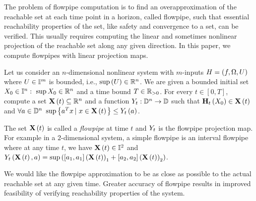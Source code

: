 The problem of flowpipe computation is to find an overapproximation of
the reachable set at each time point in a horizon, called flowpipe,
such that essential reachability properties of the set, like safety
and convergence to a set, can be verified.  This usually requires
computing the linear and sometimes nonlinear projection of the
reachable set along any given direction.  In this paper, we compute
flowpipes with linear projection maps.
%
\begin{problem}
Let us consider an $n$-dimensional nonlinear system with $m$-inputs $H
= \left(f,\Omega,U\right)$ where $U\in\mathbb{I}^m$ is bounded, i.e.,
$\sup\left(U\right)\in\mathbb{R}^n$.  We are given a bounded initial set
$X_0\in\mathbb{I}^n:~\sup{X_0}\in\mathbb{R}^n$ and a time bound
$T\in\mathbb{R}_{> 0}$.  For every $t\in[0,T]$, compute a set
$\mathbf{X}\left(t\right)\subseteq \mathbb{R}^n$ and a function
$Y_{t}:\mathbb{D}^n\rightarrow \mathbb{D}$ such that
$\mathbf{H}_{t}\left(X_0\right)\in\mathbf{X}\left(t\right)$ and $\forall
a\in\mathbb{D}^n~\sup\left\{a^Tx\left|~x\in\mathbf{X}\left(t\right)\right.\right\}\leq
Y_{t}\left(a\right)$.
\end{problem}
%
The set $\mathbf{X}\left(t\right)$ is called a 
\emph{flowpipe} at time $t$ and $Y_{t}$ is the flowpipe projection map.
For example in a $2$-dimensional system, a simple flowpipe is an
interval flowpipe where at any time $t$, we have
$\mathbf{X}\left(t\right)\in\mathbb{I}^2$ and $Y_{t}\left(\mathbf{X}\left(t\right),a\right) =
\sup\left([a_1,a_1]\left(\mathbf{X}\left(t\right)\right)_1 + [a_2,a_2]\left(\mathbf{X}\left(t\right)\right)_2\right)$.

We would like the flowpipe approximation to be as close as possible to
the actual reachable set at any given time.  Greater accuracy of flowpipe results in
improved feasibility of verifying reachability properties of the
system.
